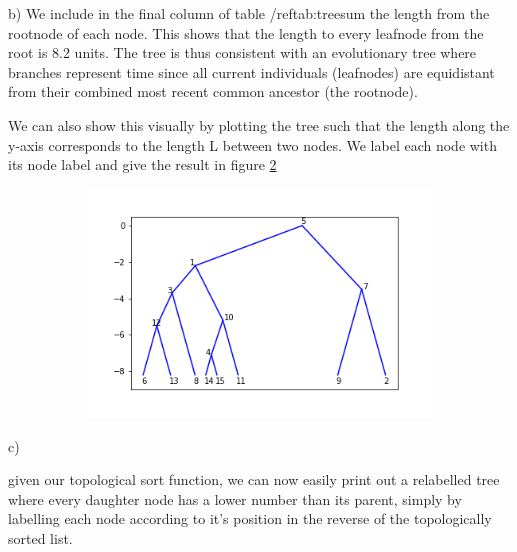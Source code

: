 \documentclass{article}
\begin{document}
b)
We include in the final column of table /ref{tab:treesum} the length from the rootnode of each node. This shows that the length to every leafnode from the root is 8.2 units. The tree is thus consistent with an evolutionary tree where branches represent time since all current individuals (leafnodes) are equidistant from their combined most recent common ancestor (the rootnode).

We can also show this visually by plotting the tree such that the length along the y-axis corresponds to the length L between two nodes. We label each node with its node label and give the result in figure \ref{fig:tree}

\begin{figure}[h]
	\centering
	\begin{subfigure}[t]{0.63\linewidth}
		\centering
		\includegraphics[width = 1.0\linewidth, trim={0 0 0 0}, clip=true]{figures/tree.png}
		\label{fig:F}	
	\end{subfigure}
\caption{}
\label{fig:tree}
\end{figure}


c)

given our topological sort function, we can now easily print out a relabelled tree where every daughter node has a lower number than its parent, simply by labelling each node according to it's position in the reverse of the topologically sorted list.
\end{document}
